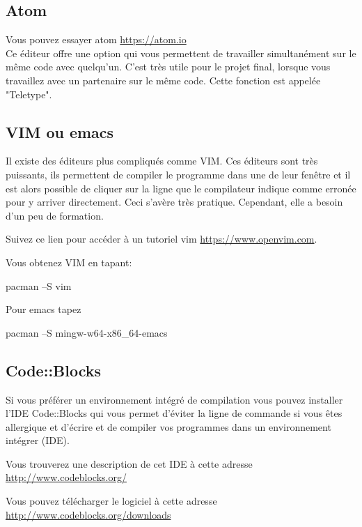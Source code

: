 \documentclass{article}
\begin{document}
\subsection{Atom}
Vous pouvez essayer atom \href{https://atom.io}{https://atom.io}\\

Ce éditeur offre une option qui vous permettent de travailler simultanément sur le même code avec quelqu'un. C'est très utile pour le projet final, lorsque vous travaillez avec un partenaire sur le même code. Cette fonction est appelée "Teletype".
\subsection{VIM ou emacs}
Il existe des éditeurs plus compliqués comme VIM. Ces éditeurs sont très puissants, ils permettent de compiler le programme dans une de leur fenêtre et il est alors possible de cliquer sur la ligne que le compilateur indique comme erronée pour y arriver directement. Ceci s’avère très pratique. Cependant, elle a besoin d'un peu de formation.

Suivez ce lien pour accéder à un tutoriel vim \href{https://www.openvim.com}{https://www.openvim.com}.

Vous obtenez VIM en tapant: 
\begin{tcolorbox}[width=\textwidth,colframe=Purple,colback={black},title={Ceci est la console MSYS2 Shell},outer arc=0mm,colupper=white]    
      pacman –S vim
\end{tcolorbox}
Pour emacs tapez 
\begin{tcolorbox}[width=\textwidth,colframe=Purple,colback={black},title={Ceci est la console MSYS2 Shell},outer arc=0mm,colupper=white]    
      pacman –S mingw-w64-x86\_64-emacs
\end{tcolorbox}

\subsection{Code::Blocks}
Si vous préférer un environnement intégré de compilation vous pouvez installer l'IDE Code::Blocks qui vous permet d'éviter la ligne de commande si vous êtes allergique et d'écrire et de compiler vos programmes dans un environnement intégrer (IDE).

Vous trouverez une description de cet IDE à cette adresse \href{http://www.codeblocks.org/}{http://www.codeblocks.org/}

Vous pouvez télécharger le logiciel à cette adresse \href{http://www.codeblocks.org/downloads}{http://www.codeblocks.org/downloads}
\end{document}
